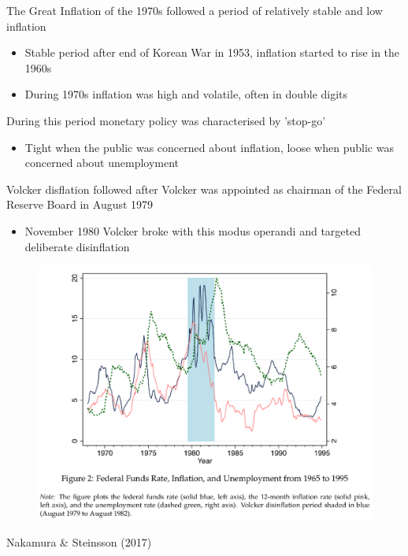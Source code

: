 \documentclass{beamer}
\begin{document}
\begin{frame}
  The Great Inflation of the 1970s followed a period of relatively stable and low inflation 
 \begin{itemize}
   \item Stable period after end of Korean War in 1953, inflation started to rise in the 1960s
   \item During 1970s inflation was high and volatile, often in double digits
 \end{itemize}
 \medskip
 During this period monetary policy was characterised by 'stop-go' 
 \begin{itemize}
   \item Tight when the public was concerned about inflation, loose when public was concerned about unemployment
 \end{itemize}
 \medskip
 Volcker  disflation followed after Volcker was appointed as chairman of the Federal Reserve Board in August 1979
 \begin{itemize}
   \item November 1980 Volcker broke with this modus operandi and targeted deliberate disinflation  
 \end{itemize}  
\end{frame}

\begin{frame}
  \begin{figure}
    \includegraphics[scale=.6]{nakamura_steinsson.eps}
  \end{figure}
  Nakamura \& Steinsson (2017)
\end{frame}
\end{document}
